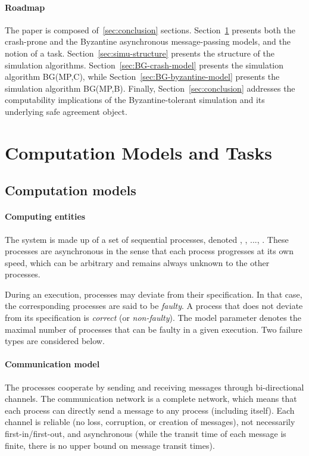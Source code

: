 \documentclass[11pt,letterpaper]{article}
\begin{document}
\paragraph{Roadmap}
The paper is composed of~\ref{sec:conclusion} sections.
Section~\ref{sec:model} presents both the crash-prone and the Byzantine
asynchronous message-passing models, and the notion of a task.
Section~\ref{sec:simu-structure} presents the structure of the simulation
algorithms. Section~\ref{sec:BG-crash-model} presents the  simulation
algorithm BG(MP,C), while Section~\ref{sec:BG-byzantine-model}
presents the simulation algorithm  BG(MP,B).
Finally, Section~\ref{sec:conclusion}  addresses 
the computability implications of the  Byzantine-tolerant 
simulation and its underlying safe agreement object. 


\section{Computation Models and Tasks}
\label{sec:model}

\subsection{Computation models}

\paragraph{Computing entities}
The system is made up of a set  of  sequential processes,
denoted , , ..., . These processes are asynchronous
in the sense that each process  progresses at  its own speed,
which can  be arbitrary and remains always unknown to the other processes.

During an execution, processes may deviate from their specification.
In that case, the corresponding processes are said to be {\it faulty}.
A process that does not deviate from its specification is {\it correct}
(or {\it non-faulty}).
The model parameter  denotes the maximal number of processes that can
be faulty in a given execution. Two failure types are considered below.



\paragraph{Communication model}
The processes cooperate by sending and receiving messages through
bi-directional channels. The communication network is a complete network,
which means that each process   can directly send a message to any
process  (including itself).
Each channel is reliable (no loss, corruption, or creation of messages),
not necessarily first-in/first-out, and asynchronous (while the transit
time of each message is finite,  there is no upper bound on message
transit times).
\end{document}
